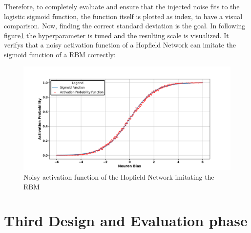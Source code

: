Therefore, to completely evaluate and ensure that the injected noise fits to the logistic sigmoid function, the function itself is plotted 
as index, to have a visual comparison. 
Now, finding the correct standard deviation is the goal. 
In following figure\ref{Noisy_acitivation_function_good} the hyperparameter is tuned and the resulting scale is visualized.
It verifys that a noisy activation function of a Hopfield Network can imitate the sigmoid function of a \ac{RBM} correctly:
\begin{figure}[H]
    \centering
    \includegraphics[width=1\linewidth]{graphics/Noisy_HNN_2.png}
    \caption{Noisy activation function of the Hopfield Network imitating the \ac{RBM}}
    \label{Noisy_acitivation_function_good}
\end{figure}
\section{Third Design and Evaluation phase}

